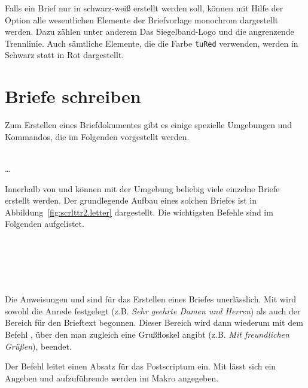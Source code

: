 Falls ein Brief nur in schwarz-weiß erstellt werden soll, können mit Hilfe
der Option  alle wesentlichen Elemente der Briefvorlage monochrom
dargestellt werden. Dazu zählen unter anderem Das Siegelband-Logo und die
angrenzende Trennlinie.
Auch sämtliche Elemente, die die Farbe \texttt{tuRed} verwenden, werden
in Schwarz statt in Rot dargestellt.

\section{Briefe schreiben}

Zum Erstellen eines Briefdokumentes gibt es einige spezielle Umgebungen und
Kommandos, die im Folgenden vorgestellt werden.

\begin{Declaration}
  \\
  \quad\dots\\
\end{Declaration}

Innerhalb von \lstinline!! und \lstinline!!
können mit der Umgebung  beliebig viele einzelne Briefe
erstellt werden. Der grundlegende Aufbau eines solchen Briefes ist in
Abbildung~\ref{fig:scrlttr2.letter} dargestellt. Die wichtigsten Befehle
sind im Folgenden aufgelistet.

\begin{Declaration}
  \\
  \\
  \\
  \\
\end{Declaration}

Die Anweisungen  und  sind für das Erstellen
eines Briefes unerlässlich. Mit  wird sowohl die Anrede
festgelegt (z.B. \textit{Sehr geehrte Damen und Herren}) als auch der
Bereich für den Brieftext begonnen.
Dieser Bereich wird dann wiederum mit dem Befehl , über den
man zugleich eine Grußfloskel angibt (z.B. \textit{Mit freundlichen Grüßen}),
beendet.

Der Befehl  leitet einen Absatz für das Postscriptum ein.
Mit  lässt sich ein  Angeben und
aufzuführende  werden im Makro  angegeben.


